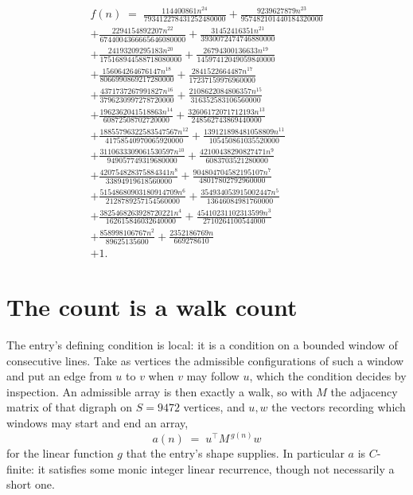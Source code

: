 \documentclass[11pt,a4paper]{article}
\theoremstyle{plain}
\theoremstyle{definition}
\begin{document}
\begin{multline*}
f(n)\;=\;\frac{114400861 n^{24}}{793412278431252480000} + \frac{9239627879 n^{23}}{957482101440184320000} \\
+ \frac{2294154892207 n^{22}}{6744004366665646080000} + \frac{31452416351 n^{21}}{3930072474746880000} \\
+ \frac{24193209295183 n^{20}}{175168944588718080000} + \frac{26794300136633 n^{19}}{14597412049059840000} \\
+ \frac{156064264676147 n^{18}}{8066990869217280000} + \frac{2841522664487 n^{17}}{17237159976960000} \\
+ \frac{4371737267991827 n^{16}}{3796230997278720000} + \frac{2108622084806357 n^{15}}{316352583106560000} \\
+ \frac{1962362041518863 n^{14}}{60872508702720000} + \frac{32606172071712193 n^{13}}{248562743869440000} \\
+ \frac{18855796322583547567 n^{12}}{41758540970065920000} + \frac{139121898481058809 n^{11}}{105450861035520000} \\
+ \frac{3110633309061530597 n^{10}}{949057749319680000} + \frac{42100438290827471 n^{9}}{6083703521280000} \\
+ \frac{420754828375884341 n^{8}}{33894919618560000} + \frac{904804704582195107 n^{7}}{48017802792960000} \\
+ \frac{51548680903180914709 n^{6}}{2128789257154560000} + \frac{354934053915002447 n^{5}}{13646084981760000} \\
+ \frac{3825468263928720221 n^{4}}{162615846032640000} + \frac{45410231102313599 n^{3}}{2710264100544000} \\
+ \frac{858998106767 n^{2}}{89625135600} + \frac{2352186769 n}{669278610} \\
+ 1.
\end{multline*}

\section{The count is a walk count}

The entry's defining condition is local: it is a condition on a bounded window of consecutive lines. Take as vertices the
admissible configurations of such a window and put an edge from $u$ to $v$ when $v$ may
follow $u$, which the condition decides by inspection. An admissible array is then exactly a
walk, so with $M$ the adjacency matrix of that digraph on $S=9472$ vertices, and $u,w$ the
vectors recording which windows may start and end an array,
\[
a(n)\;=\;u^{\!\top}M^{\,g(n)}w
\]
for the linear function $g$ that the entry's shape supplies. In particular $a$ is
$C$-finite: it satisfies some monic integer linear recurrence, though not necessarily a short
one.
\end{document}

